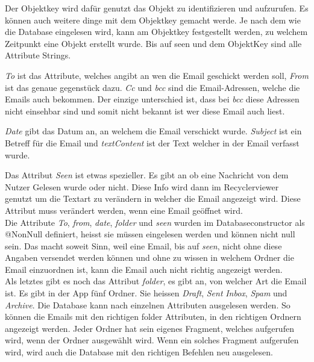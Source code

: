 \documentclass[a4paper,11pt]{article}
\begin{document}
Der Objektkey wird dafür genutzt das Objekt zu identifizieren und aufzurufen. Es können auch weitere dinge mit dem Objektkey gemacht werde. 
Je nach dem wie die Database eingelesen wird, kann am Objektkey festgestellt werden, zu welchem Zeitpunkt eine Objekt erstellt wurde. Bis auf seen und dem ObjektKey sind 
alle Attribute Strings. 

\textit{To} ist das Attribute, welches angibt an wen die Email geschickt werden soll, \textit{From} ist das genaue gegenstück dazu. \textit{Cc} und \textit{bcc} sind die 
Email-Adressen, welche die Emails auch bekommen. Der einzige unterschied ist, dass bei \textit{bcc} diese Adressen nicht einsehbar sind und somit nicht bekannt ist wer diese Email auch liest. 

\textit{Date} gibt das Datum an, an welchem die Email verschickt wurde. \textit{Subject} ist ein Betreff für die Email und \textit{textContent} ist der Text welcher in der Email verfasst wurde. 

Das Attribut \textit{Seen} ist etwas spezieller. Es gibt an ob eine Nachricht von dem Nutzer Gelesen wurde oder nicht. Diese Info wird dann im Recyclerviewer genutzt um die Textart zu verändern
in welcher die Email angezeigt wird. Diese Attribut muss verändert werden, wenn eine Email geöffnet wird. \\

Die Attribute \textit{To}, \textit{from}, \textit{date}, \textit{folder} und \textit{seen} wurden im Databaseconstructor als @NonNull definiert, heisst sie müssen eingelesen werden und können 
nicht null sein. Das macht soweit Sinn, weil eine Email, bis auf \textit{seen}, nicht ohne diese Angaben versendet werden können und ohne zu wissen in welchem Ordner die Email einzuordnen ist,
kann die Email auch nicht richtig angezeigt werden. \\

Als letztes gibt es noch das Attribut \textit{folder}, es gibt an, von welcher Art die Email ist. Es gibt in der App fünf Ordner. Sie heissen \textit{Draft}, \textit{Sent} 
\textit{Inbox}, \textit{Spam} und \textit{Archive}. Die Database kann nach einzelnen Attributen ausgelesen werden. So können die Emails mit den richtigen
folder Attributen, in den richtigen Ordnern angezeigt werden. Jeder Ordner hat sein eigenes Fragment, welches aufgerufen wird, wenn der Ordner ausgewählt wird.
Wenn ein solches Fragment aufgerufen wird, wird auch die Database mit den richtigen Befehlen neu ausgelesen.  \\
\end{document}
